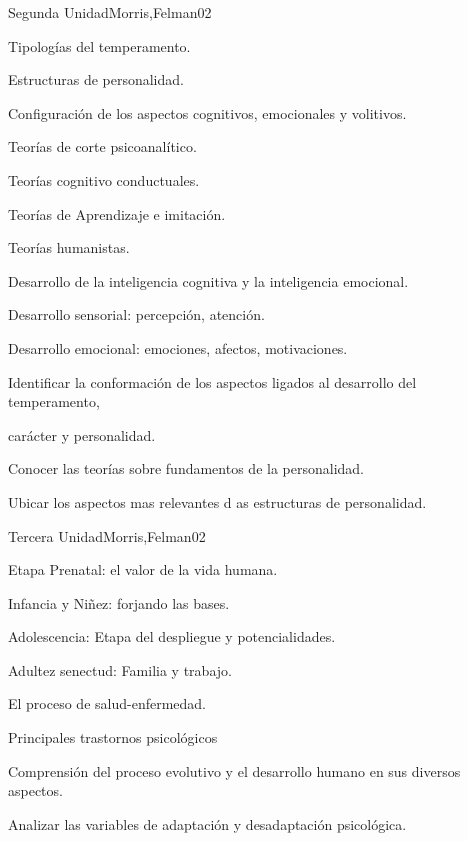 \begin{syllabus}
\begin{unit}{Segunda Unidad}{Morris,Felman}{0}{2}
\begin{topics}
	\item Tipologías del temperamento.
	\item Estructuras de personalidad.
	\item Configuración de los aspectos cognitivos, emocionales y volitivos.
	\item Teorías de corte psicoanalítico.
	\item Teorías cognitivo conductuales.
	\item Teorías de Aprendizaje e imitación.
	\item Teorías humanistas.
	\item Desarrollo de la inteligencia cognitiva y la inteligencia emocional.
	\item Desarrollo sensorial: percepción, atención.
	\item Desarrollo emocional: emociones, afectos, motivaciones.
\end{topics}
\begin{unitgoals}
	\item Identificar la conformación de los aspectos ligados al desarrollo del temperamento,  
	\item       carácter y personalidad.
	\item Conocer las teorías sobre fundamentos de la personalidad.
	\item Ubicar los aspectos mas relevantes d as estructuras de personalidad.
\end{unitgoals}
\end{unit}

\begin{unit}{Tercera Unidad}{Morris,Felman}{0}{2}
\begin{topics}
	\item  Etapa Prenatal: el valor de la vida humana.
	\item Infancia y Niñez: forjando las bases.
	\item Adolescencia: Etapa del despliegue y potencialidades.
	\item Adultez senectud: Familia y trabajo.
	\item El proceso de salud-enfermedad.
	\item Principales trastornos psicológicos
\end{topics}
\begin{unitgoals}
	\item Comprensión del proceso evolutivo y el desarrollo humano en sus diversos aspectos.
	\item Analizar las variables de adaptación y desadaptación psicológica.
\end{unitgoals}
\end{unit}


\end{syllabus}
